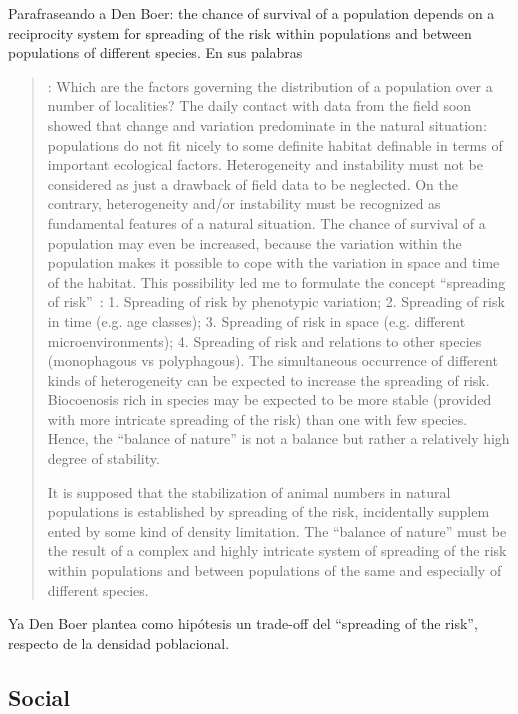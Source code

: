 \documentclass[a4paper,10pt]{article}
\begin{document}
Parafraseando a Den Boer: the chance of survival of a population depends on a reciprocity system for spreading of the risk within populations and between populations of different species.
En sus palabras
\begin{quotation} \cite{denBoer1968-spreadingRisk}: 
    Which are the factors governing the distribution of a population over a number of localities?
    The daily contact with data from the field soon showed that change and variation predominate in the natural situation: populations do not fit
    nicely to some definite habitat definable in terms of important ecological factors.
    Heterogeneity and instability must not be considered as just a drawback of field data to be neglected.
    On the contrary, heterogeneity and/or instability must be recognized as fundamental features of a natural situation.
    The chance of survival of a population may even be increased, because the variation within the population makes it possible to cope with the variation in space and time of the habitat.
    This possibility led me to formulate the concept ``spreading of risk''~\cite{denBoer1968-spreadingRisk}: 1. Spreading of risk by phenotypic variation; 2. Spreading of risk in time (e.g. age classes); 3. Spreading of risk in space (e.g. different microenvironments); 4. Spreading of risk and relations to other species (monophagous vs polyphagous).
    The simultaneous occurrence of different kinds of heterogeneity can be expected to increase the spreading of risk.
    Biocoenosis rich in species may be expected to be more stable (provided with more intricate spreading of the risk) than one with few species.
    Hence, the ``balance of nature'' is not a balance but rather a relatively high degree of stability.

    It is supposed that the stabilization of animal numbers in natural populations is established by spreading of the risk, incidentally supplem ented by some kind of density limitation.
    The ``balance of nature'' must be the result of a complex and highly intricate system of spreading of the risk within populations and between populations of the same and especially of different species.
\end{quotation}

Ya Den Boer plantea como hipótesis un trade-off del ``spreading of the risk'', respecto de la densidad poblacional.


\subsection{Social}
\end{document}
